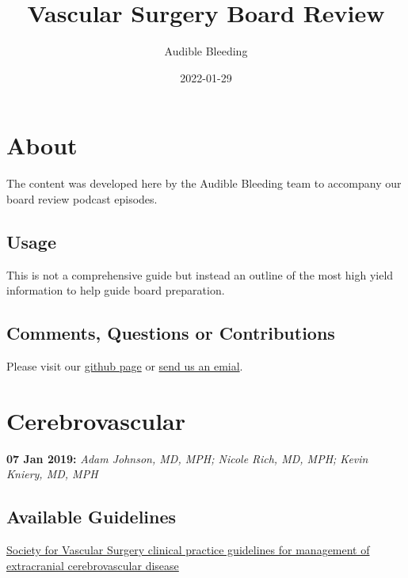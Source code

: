 \documentclass[
]{book}
\title{Vascular Surgery Board Review}
\author{Audible Bleeding}
\date{2022-01-29}
\begin{document}
\maketitle

{
\setcounter{tocdepth}{1}
\tableofcontents
}
\hypertarget{about}{%
\chapter{About}\label{about}}

The content was developed here by the Audible Bleeding team to accompany our board review podcast episodes.

\hypertarget{usage}{%
\section{Usage}\label{usage}}

This is not a comprehensive guide but instead an outline of the most high yield information to help guide board preparation.

\hypertarget{comments-questions-or-contributions}{%
\section{Comments, Questions or Contributions}\label{comments-questions-or-contributions}}

Please visit our \href{https://github.com/adam-mdmph/VS-Board-Review}{github page} or \href{mailto:audiblebleeding@vascularsociety.org}{send us an emial}.

\hypertarget{cerebrovascular}{%
\chapter{Cerebrovascular}\label{cerebrovascular}}

\textbf{07 Jan 2019:} \emph{Adam Johnson, MD, MPH; Nicole Rich, MD, MPH; Kevin
Kniery, MD, MPH}

\hypertarget{available-guidelines}{%
\section{Available Guidelines}\label{available-guidelines}}

\href{https://www.jvascsurg.org/article/S0741-5214(21)00893-4/fulltext}{Society for Vascular Surgery clinical practice guidelines for
management of extracranial cerebrovascular
disease}
\citet{aburahmaSocietyVascularSurgery2022}
\end{document}
